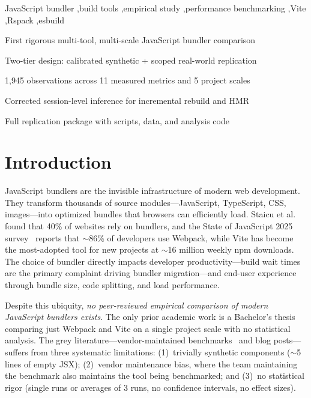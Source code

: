 \documentclass[preprint,12pt]{elsarticle}
\begin{document}
\begin{frontmatter}
\begin{keyword}
JavaScript bundler \sep build tools \sep empirical study \sep performance benchmarking \sep Vite \sep Rspack \sep esbuild
\end{keyword}

\begin{highlights}
\item First rigorous multi-tool, multi-scale JavaScript bundler comparison
\item Two-tier design: calibrated synthetic + scoped real-world replication
\item 1{,}945 observations across 11 measured metrics and 5 project scales
\item Corrected session-level inference for incremental rebuild and HMR
\item Full replication package with scripts, data, and analysis code
\end{highlights}

\end{frontmatter}

\section{Introduction}\label{sec:intro}

JavaScript bundlers are the invisible infrastructure of modern web development.
They transform thousands of source modules---JavaScript, TypeScript, CSS, images---into optimized bundles that browsers can efficiently load.
Staicu et al.~\cite{staicu2023jackinthebox} found that 40\% of websites rely on bundlers, and the State of JavaScript 2025 survey~\cite{stateofjs2025} reports that $\sim$86\% of developers use Webpack, while Vite has become the most-adopted tool for new projects at $\sim$16 million weekly npm downloads.
The choice of bundler directly impacts developer productivity---build wait times are the primary complaint driving bundler migration---and end-user experience through bundle size, code splitting, and load performance.

Despite this ubiquity, \emph{no peer-reviewed empirical comparison of modern JavaScript bundlers exists}.
The only prior academic work is a Bachelor's thesis~\cite{nguyen2024comparative} comparing just Webpack and Vite on a single project scale with no statistical analysis.
The grey literature---vendor-maintained benchmarks~\cite{rspackbench2026,rolldownbench2026} and blog posts---suffers from three systematic limitations: (1)~trivially synthetic components ($\sim$5 lines of empty JSX); (2)~vendor maintenance bias, where the team maintaining the benchmark also maintains the tool being benchmarked; and (3)~no statistical rigor (single runs or averages of 3 runs, no confidence intervals, no effect sizes).
\end{document}
